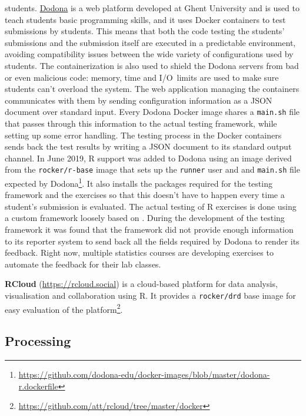 students. \href{https://dodona.ugent.be}{Dodona} is a web platform
developed at Ghent University and is used to teach students basic
programming skills, and it uses Docker containers to test submissions by
students. This means that both the code testing the students'
submissions and the submission itself are executed in a predictable
environment, avoiding compatibility issues between the wide variety of
configurations used by students. The containerization is also used to
shield the Dodona servers from bad or even malicious code: memory, time
and I/O~limits are used to make sure students can't overload the system.
The web application managing the containers communicates with them by
sending configuration information as a JSON document over standard
input. Every Dodona Docker image shares a \texttt{main.sh} file that
passes through this information to the actual testing framework, while
setting up some error handling. The testing process in the Docker
containers sends back the test results by writing a JSON document to its
standard output channel. In June 2019, R support was added to Dodona
using an image derived from the \texttt{rocker/r-base} image that sets
up the \texttt{runner} user and and \texttt{main.sh} file expected by
Dodona\footnote{\href{https://github.com/dodona-edu/docker-images/blob/master/dodona-r.dockerfile}{https://github.com/dodona-edu/docker-images/blob/master/dodona-r.dockerfile}}.
It also installs the packages required for the testing framework and the
exercises so that this doesn't have to happen every time a student's
submission is evaluated. The actual testing of R exercises is done using
a custom framework loosely based on . During the
development of the testing framework it was found that the
 framework did not provide enough information to its
reporter system to send back all the fields required by Dodona to render
its feedback. Right now, multiple statistics courses are developing
exercises to automate the feedback for their lab classes.

\textbf{RCloud} (\url{https://rcloud.social}) is a cloud-based platform
for data analysis, visualisation and collaboration using R. It provides
a \texttt{rocker/drd} base image for easy evaluation of the
platform\footnote{\href{https://github.com/att/rcloud/tree/master/docker}{https://github.com/att/rcloud/tree/master/docker}}.

\hypertarget{processing}{%
\subsection{Processing}\label{processing}}

